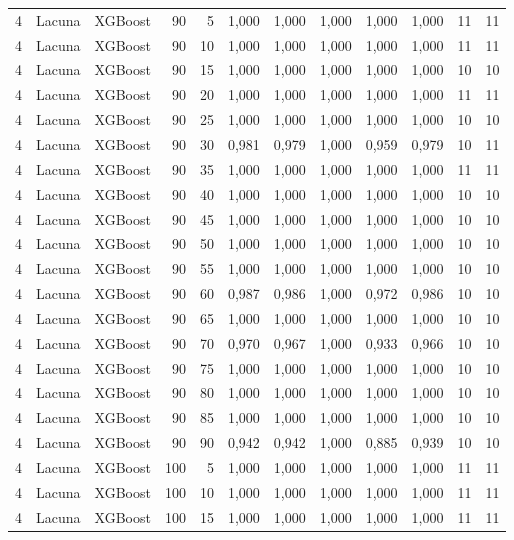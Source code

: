 \begin{longtable}{@{}rllrrrrrrrrr@{}}
4 & Lacuna & XGBoost & 90 & 5 & 1,000 & 1,000 & 1,000 & 1,000 & 1,000 & 11 & 11 \\
4 & Lacuna & XGBoost & 90 & 10 & 1,000 & 1,000 & 1,000 & 1,000 & 1,000 & 11 & 11 \\
4 & Lacuna & XGBoost & 90 & 15 & 1,000 & 1,000 & 1,000 & 1,000 & 1,000 & 10 & 10 \\
4 & Lacuna & XGBoost & 90 & 20 & 1,000 & 1,000 & 1,000 & 1,000 & 1,000 & 11 & 11 \\
4 & Lacuna & XGBoost & 90 & 25 & 1,000 & 1,000 & 1,000 & 1,000 & 1,000 & 10 & 10 \\
4 & Lacuna & XGBoost & 90 & 30 & 0,981 & 0,979 & 1,000 & 0,959 & 0,979 & 10 & 11 \\
4 & Lacuna & XGBoost & 90 & 35 & 1,000 & 1,000 & 1,000 & 1,000 & 1,000 & 11 & 11 \\
4 & Lacuna & XGBoost & 90 & 40 & 1,000 & 1,000 & 1,000 & 1,000 & 1,000 & 10 & 10 \\
4 & Lacuna & XGBoost & 90 & 45 & 1,000 & 1,000 & 1,000 & 1,000 & 1,000 & 10 & 10 \\
4 & Lacuna & XGBoost & 90 & 50 & 1,000 & 1,000 & 1,000 & 1,000 & 1,000 & 10 & 10 \\
4 & Lacuna & XGBoost & 90 & 55 & 1,000 & 1,000 & 1,000 & 1,000 & 1,000 & 10 & 10 \\
4 & Lacuna & XGBoost & 90 & 60 & 0,987 & 0,986 & 1,000 & 0,972 & 0,986 & 10 & 10 \\
4 & Lacuna & XGBoost & 90 & 65 & 1,000 & 1,000 & 1,000 & 1,000 & 1,000 & 10 & 10 \\
4 & Lacuna & XGBoost & 90 & 70 & 0,970 & 0,967 & 1,000 & 0,933 & 0,966 & 10 & 10 \\
4 & Lacuna & XGBoost & 90 & 75 & 1,000 & 1,000 & 1,000 & 1,000 & 1,000 & 10 & 10 \\
4 & Lacuna & XGBoost & 90 & 80 & 1,000 & 1,000 & 1,000 & 1,000 & 1,000 & 10 & 10 \\
4 & Lacuna & XGBoost & 90 & 85 & 1,000 & 1,000 & 1,000 & 1,000 & 1,000 & 10 & 10 \\
4 & Lacuna & XGBoost & 90 & 90 & 0,942 & 0,942 & 1,000 & 0,885 & 0,939 & 10 & 10 \\
4 & Lacuna & XGBoost & 100 & 5 & 1,000 & 1,000 & 1,000 & 1,000 & 1,000 & 11 & 11 \\
4 & Lacuna & XGBoost & 100 & 10 & 1,000 & 1,000 & 1,000 & 1,000 & 1,000 & 11 & 11 \\
4 & Lacuna & XGBoost & 100 & 15 & 1,000 & 1,000 & 1,000 & 1,000 & 1,000 & 11 & 11 \\

\end{longtable}
